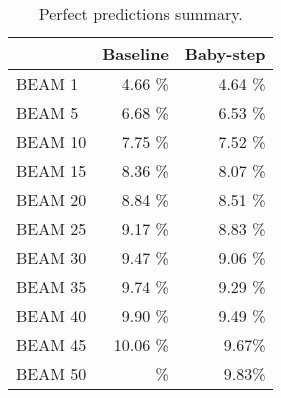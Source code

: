 \begin{table}[h!]
    \centering
    \begin{tabular}{l|r|r} 
    & Baseline & Baby-step\\ [0.5ex] 
    \hline
    BEAM 1 & 4.66 \% & 4.64 \%\\  
    BEAM 5 & 6.68 \% & 6.53 \% \\ 
    BEAM 10 & 7.75 \% & 7.52 \%\\
    BEAM 15 & 8.36 \% & 8.07 \%\\
    BEAM 20 & 8.84 \% & 8.51 \%\\
    BEAM 25 & 9.17 \% & 8.83 \%\\
    BEAM 30 & 9.47 \% & 9.06 \%\\
    BEAM 35 & 9.74 \% & 9.29 \%\\
    BEAM 40 & 9.90 \% & 9.49 \%\\
    BEAM 45 & 10.06 \%& 9.67\%\\
    BEAM 50 & \%& 9.83\%\\ [1ex]
    \end{tabular}
    \caption{Perfect predictions summary.}
    \label{table:2}
\end{table}
